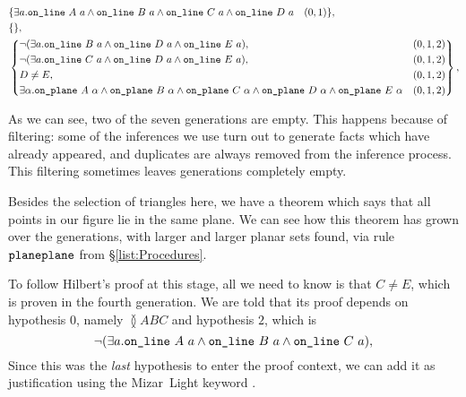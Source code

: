 {\begin{minipage}{\linewidth}
\begin{displaymath}
\begin{split}
      &\{\exists a. \code{on\_line}\ A\ a\wedge \code{on\_line}\ B\ a\wedge \code{on\_line}\ C\ a\wedge\code{on\_line}\ D\ a \quad (0,1)\},\\
      &\{\},\\
    &\left\{\begin{aligned}
        &\Triangle{a}{B}{D}{E}, & (0,1,2)\\
        &\Triangle{a}{C}{D}{E}, & (0,1,2)\\
        &D\neq E, & (0,1,2)\\
      &\exists \alpha. \code{on\_plane}\ A\ \alpha\wedge \code{on\_plane}\ B\ \alpha\wedge \code{on\_plane}\ C\ \alpha\wedge\code{on\_plane}\ D\ \alpha\wedge\code{on\_plane}\ E\ \alpha & (0,1,2)
    \end{aligned}\right\},\\
\end{split}
\end{displaymath}
\end{minipage}}
\linebreak

As we can see, two of the seven generations are empty. This happens because of filtering: some of the inferences we use turn out to generate facts which have already appeared, and duplicates are always removed from the inference process. This filtering sometimes leaves generations completely empty. 

Besides the selection of triangles here, we have a theorem which says that all points in our figure lie in the same plane. We can see how this theorem has grown over the generations, with larger and larger planar sets found, via rule~$\texttt{planeplane}$ from \S\ref{list:Procedures}. 

To follow Hilbert's proof at this stage, all we need to know is that $C\neq E$, which is proven in the fourth generation. We are told that its proof depends on hypothesis $0$, namely $\between{A}{B}{C}$ and hypothesis $2$, which is 
\begin{displaymath}
\neg(\exists a.\texttt{on\_line}\ A\ a\wedge \texttt{on\_line}\ B\ a\wedge \texttt{on\_line}\ C\ a),
\end{displaymath}
Since this was the \emph{last} hypothesis to enter the proof context, we can add it as justification using the Mizar~Light keyword .

\linebreak

